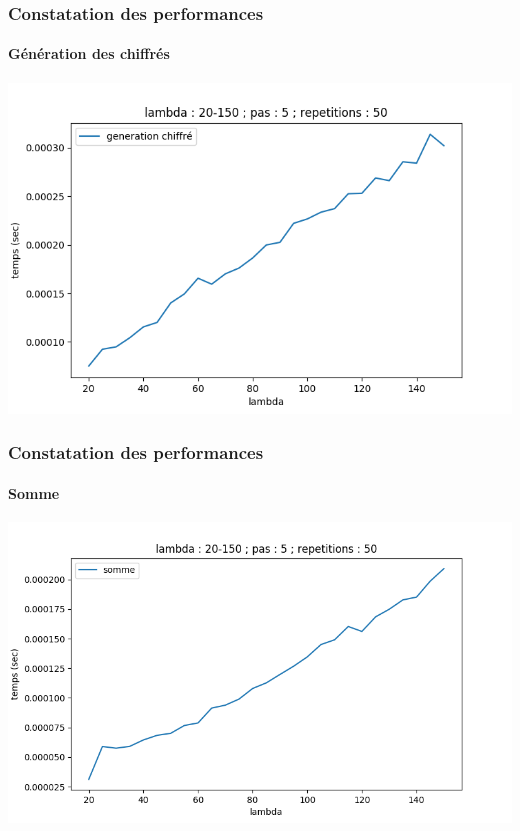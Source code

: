 \begin{frame}
\frametitle{Constatation des performances}
\framesubtitle{Génération des chiffrés}
\begin{center}
\includegraphics[scale=0.46]{images/generation_chiffre2.png} 
\end{center}
\end{frame}

\begin{frame}
\frametitle{Constatation des performances}
\framesubtitle{Somme}
\begin{center}
\includegraphics[scale=0.46]{images/somme.png} 
\end{center}
\end{frame}

